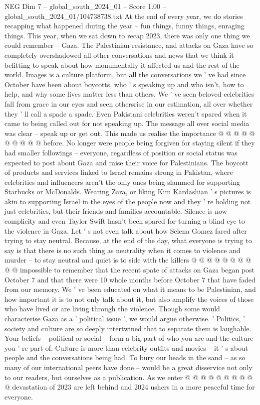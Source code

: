 \begin{textsample}{NEG Dim 7 – global\_south\_2024\_01 – Score 1.00 – global\_south\_2024\_01/104738738.txt}  \label{ex:f7_neg_148}
At the end of every year, we do stories recapping what happened during the year -- fun things, funny things, enraging things.
This year, when we sat down to recap 2023, there was only one thing we could remember -- Gaza.
The Palestinian resistance, and attacks on Gaza have so completely overshadowed all other conversations and news that we think it befitting to speak about how monumentally it affected us and the rest of the world.
Images is a culture platform, but all the conversations we ' ve had since October have been about boycotts, who ' s speaking up and who isn't, how to help, and why some lives matter less than others.
We ' ve seen beloved celebrities fall from grace in our eyes and seen othersrise in our estimation, all over whether they ' ll call a spade a spade.
Even Pakistani celebrities weren't spared when it came to being called out for not speaking up.
The message all over social media was clear -- speak up or get out.
This made us realise the importance @ @ @ @ @ @ @ @ @ @ before.
No longer were people being forgiven for staying silent if they had smaller followings -- everyone, regardless of position or social status was expected to post about Gaza and raise their voice for Palestinians.
The boycott of products and services linked to Israel remains strong in Pakistan, where celebrities and influencers aren't the only ones being slammed for supporting Starbucks or McDonalds.
Wearing Zara, or liking Kim Kardashian ' s pictures is akin to supporting Israel in the eyes of the people now and they ' re holding not just celebrities, but their friends and families accountable.
Silence is now complicity and even Taylor Swift hasn't been spared for turning a blind eye to the violence in Gaza.
Let ' s not even talk about how Selena Gomez fared after trying to stay neutral.
Because, at the end of the day, what everyone is trying to say is that there is no such thing as neutrality when it comes to violence and murder -- to stay neutral and quiet is to side with the killers @ @ @ @ @ @ @ @ @ @ impossible to remember that the recent spate of attacks on Gaza began post October 7 and that there were 10 whole months before October 7 that have faded from our memory.
We ' ve been educated on what it means to be Palestinian, and how important it is to not only talk about it, but also amplify the voices of those who have lived or are living through the violence.
Though some would characterise Gaza as a ' political issue ', we would argue otherwise. ' Politics, ' society and culture are so deeply intertwined that to separate them is laughable.
Your beliefs -- political or social -- form a big part of who you are and the culture you ' re part of.
Culture is more than celebrity outfits and movies -- it ' s about people and the conversations being had.
To bury our heads in the sand -- as so many of our international peers have done -- would be a great disservice not only to our readers, but ourselves as a publication.
As we enter @ @ @ @ @ @ @ @ @ @ devastation of 2023 are left behind and 2024 ushers in a more peaceful time for everyone.

\end{textsample}
